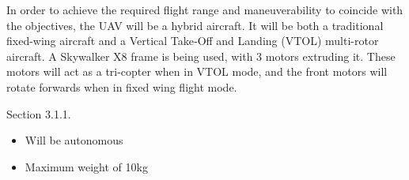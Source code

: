In order to achieve the required flight range and maneuverability to coincide with the objectives, the UAV will be a hybrid aircraft. It will be both a traditional fixed-wing aircraft and a Vertical Take‐Off and Landing (VTOL) multi-rotor aircraft.  A Skywalker X8 frame is being used, with 3 motors extruding it. These motors will act as a tri-copter when in VTOL mode, and the front motors will rotate forwards when in fixed wing flight mode.  

Section 3.1.1. 
\begin{itemize}
	\item Will be autonomous
	\item Maximum weight of 10kg
\end{itemize}
